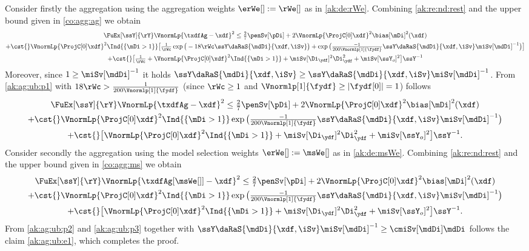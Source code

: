 \begin{pro}
  Consider firstly the aggregation using the aggregation weights
  $\erWe[]:=\rWe[]$ as in \eqref{ak:de:rWe}.  Combining
  \cref{ak:re:nd:rest} and the upper bound given in \eqref{co:agg:ag}
  we obtain
  \begin{multline}\label{ak:ag:ub:p1}
    \FuEx[\ssY]{\rY}\VnormLp{\txdfAg-\xdf}^2\leq \tfrac{2}{7}\penSv[\pDi]
    +2\VnormLp{\ProjC[0]\xdf}^2\bias[\mDi]^2(\xdf)
    \\\hfill
 + \cst{}\VnormLp{\ProjC[0]\xdf}^2\Ind{\{\mDi>1\}}\big[ \tfrac{1}{\rWc}
     \exp\big(-18\rWc\ssY\daRaS{\mdDi}{\xdf,\iSv}\big)+
 \exp\big(\tfrac{-1}{200\Vnormlp[1]{\fydf}}\ssY\daRaS{\mdDi}{\xdf,\iSv}\miSv[\mdDi]^{-1}\big)\big]
 \\
 +\cst{}\big[\tfrac{1}{\rWc}+
 \VnormLp{\ProjC[0]\xdf}^2\Ind{\{\mDi>1\}}
+\miSv[\Di_{\ydf}]^2\Di_{\ydf}^2+\miSv[\ssY_{o}]^2 \big]\ssY^{-1}
  \end{multline}
 Moreover, since $1\geq\miSv[\mdDi]^{-1}$  it holds
$\ssY\daRaS{\mdDi}{\xdf,\iSv}\geq\ssY\daRaS{\mdDi}{\xdf,\iSv}\miSv[\mdDi]^{-1}$. From
\eqref{ak:ag:ub:p1} with $18\rWc>\tfrac{1}{200\Vnormlp[1]{\fydf}}$
(since $\rWc\geq1$ and $\Vnormlp[1]{\fydf}\geq|\fydf[0]|=1$) follows
  \begin{multline}\label{ak:ag:ub:p2}
    \FuEx[\ssY]{\rY}\VnormLp{\txdfAg-\xdf}^2\leq \tfrac{2}{7}\penSv[\pDi]
    +2\VnormLp{\ProjC[0]\xdf}^2\bias[\mDi]^2(\xdf)
    \\\hfill
 + \cst{}\VnormLp{\ProjC[0]\xdf}^2\Ind{\{\mDi>1\}}
 \exp\big(\tfrac{-1}{200\Vnormlp[1]{\fydf}}\ssY\daRaS{\mdDi}{\xdf,\iSv}\miSv[\mdDi]^{-1}\big)
 \\
 +\cst{}\big[
 \VnormLp{\ProjC[0]\xdf}^2\Ind{\{\mDi>1\}}
+\miSv[\Di_{\ydf}]^2\Di_{\ydf}^2+\miSv[\ssY_{o}]^2 \big]\ssY^{-1}.
  \end{multline}
  Consider secondly the aggregation using the model selection weights $\erWe[]:=\msWe[]$
  as in \eqref{ak:de:msWe}. Combining
  \cref{ak:re:nd:rest} and the upper bound given in \eqref{co:agg:ms}
  we obtain
  \begin{multline}\label{ak:ag:ub:p3}
    \FuEx[\ssY]{\rY}\VnormLp{\txdfAg[{\msWe[]}]-\xdf}^2\leq \tfrac{2}{7}\penSv[\pDi]
    +2\VnormLp{\ProjC[0]\xdf}^2\bias[\mDi]^2(\xdf)
    \\\hfill
 + \cst{}\VnormLp{\ProjC[0]\xdf}^2\Ind{\{\mDi>1\}}
 \exp\big(\tfrac{-1}{200\Vnormlp[1]{\fydf}}\ssY\daRaS{\mdDi}{\xdf,\iSv}\miSv[\mdDi]^{-1}\big)
 \\
 +\cst{}\big[
 \VnormLp{\ProjC[0]\xdf}^2\Ind{\{\mDi>1\}}
+\miSv[\Di_{\ydf}]^2\Di_{\ydf}^2+\miSv[\ssY_{o}]^2 \big]\ssY^{-1}.
  \end{multline}  
From \eqref{ak:ag:ub:p2} and \eqref{ak:ag:ub:p3} together with
$\ssY\daRaS{\mdDi}{\xdf,\iSv}\miSv[\mdDi]^{-1}\geq\cmiSv[\mdDi]\mdDi$
follows the claim \eqref{ak:ag:ub:e1}, which  completes the proof.
\proEnd\end{pro}
